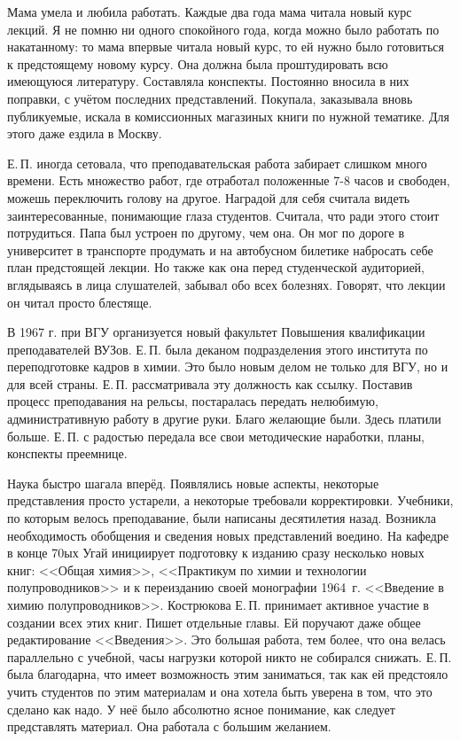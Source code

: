 Мама умела и любила работать. Каждые два года мама читала новый курс лекций. Я не помню ни одного спокойного года, когда можно было работать по накатанному: то мама впервые читала новый курс, то ей нужно было готовиться к предстоящему новому курсу. Она должна была проштудировать всю имеющуюся литературу. Составляла конспекты. Постоянно вносила в них поправки, с учётом последних представлений. Покупала, заказывала вновь публикуемые, искала в комиссионных магазиных книги по нужной тематике. Для этого даже ездила в Москву.

Е.\,П. иногда сетовала, что преподавательская работа забирает слишком много времени. Есть множество работ, где отработал положенные 7-8 часов и свободен, можешь переключить голову на другое. Наградой для себя считала видеть заинтересованные, понимающие глаза студентов. Считала, что ради этого стоит потрудиться. Папа был устроен по другому, чем она. Он мог по дороге в университет в транспорте продумать и на автобусном билетике набросать себе план предстоящей лекции. Но также как она перед студенческой аудиторией, вглядываясь в лица слушателей, забывал обо всех болезнях. Говорят, что лекции он читал просто блестяще.

В 1967 г. при ВГУ организуется новый факультет Повышения квалификации преподавателей ВУЗов. Е.\,П. была деканом подразделения этого института по переподготовке кадров в химии. Это было новым делом не только для ВГУ, но и для всей страны. Е.\,П. рассматривала эту должность как ссылку. Поставив процесс преподавания на рельсы, постаралась передать нелюбимую, административную работу в другие руки. Благо желающие были. Здесь платили больше. Е.\,П. с радостью передала все свои методические наработки, планы, конспекты преемнице.

Наука быстро шагала вперёд.
Появлялись новые аспекты, некоторые представления просто устарели, а некоторые требовали корректировки.
Учебники, по которым велось преподавание, были написаны десятилетия назад.
Возникла необходимость обобщения и сведения новых представлений воедино.
На кафедре в конце 70ых Угай инициирует подготовку к изданию сразу несколько новых книг:
<<Общая химия>>, <<Практикум по химии и технологии полупроводников>> и к переизданию своей монографии 1964~г. <<Введение в химию полупроводников>>. Кострюкова Е.\,П. принимает активное участие в создании всех этих книг. Пишет отдельные главы. Ей поручают даже общее редактирование <<Введения>>. Это большая работа, тем более, что она велась параллельно с учебной, часы нагрузки которой никто не собирался снижать. Е.\,П. была благодарна, что имеет возможность этим заниматься, так как ей предстояло учить студентов по этим материалам и она хотела быть уверена в том, что это сделано как надо. У неё было абсолютно ясное понимание, как следует представлять материал. Она работала с большим желанием.

